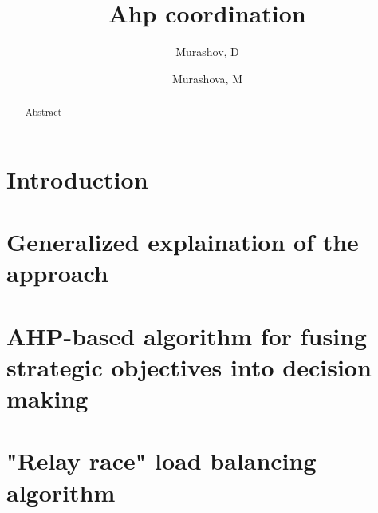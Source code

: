 \documentclass{article}
\author{Murashov, D \and Murashova, M}
\title{Ahp coordination}
\begin{document}
    \maketitle

    \begin{abstract}
        Abstract
    \end{abstract}

    \section{Introduction}

    

    

    \section{Generalized explaination of the approach}

    

    \section{AHP-based algorithm for fusing strategic objectives into decision making}

    

    \section{"Relay race" load balancing algorithm}

    

    \medskip

    

    
\end{document}

